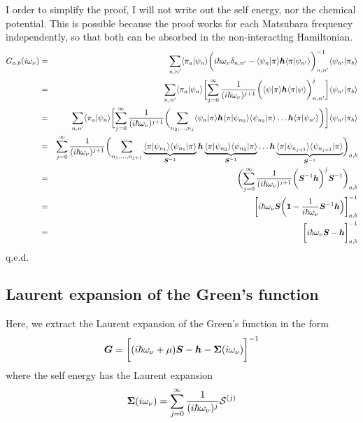 \documentclass[11pt,a4paper]{report}
\begin{document}
I order to simplify the proof, I will not write out the self energy,
nor the chemical potential. This is possible because the proof works
for each Matsubara frequency independently, so that both can be
absorbed in the non-interacting Hamiltonian.
\begin{eqnarray}
G_{a,b}(i\omega_\nu)
&=&
\sum_{n,n'}\langle\pi_a|\psi_{n}\rangle
\biggl(i\hbar\omega_\nu\delta_{n,n'}
-
\langle\psi_n|\pi\rangle
\bm{h}
\langle\pi|\psi_{n'}\rangle\biggr)^{-1}_{n,n'}
\langle\psi_{n'}|\pi_b\rangle
\nonumber\\
&=&
\sum_{n,n'}\langle\pi_a|\psi_{n}\rangle
\biggl[
\sum_{j=0}^\infty
\frac{1}{(i\hbar\omega_\nu)^{j+1}}
\biggl(
\langle\psi|\pi\rangle
\bm{h}
\langle\pi|\psi\rangle\biggr)^j_{n,n'}
\biggr]\langle\psi_{n'}|\pi_b\rangle
\nonumber\\
&=&
\sum_{n,n'}\langle\pi_a|\psi_{n}\rangle
\biggl[
\sum_{j=0}^\infty
\frac{1}{(i\hbar\omega_\nu)^{j+1}}
\biggl(\sum_{n_2,\ldots,n_{j}} 
\langle\psi_{n}|\pi\rangle
\bm{h}
\langle\pi|\psi_{n_2}\rangle\langle\psi_{n_2}|\pi\rangle
\ldots
\bm{h}
\langle\pi|\psi_{n'}\rangle\biggr)\biggr]
\langle\psi_{n'}|\pi_b\rangle
\nonumber\\
&=&
\sum_{j=0}^\infty\frac{1}{(i\hbar\omega_\nu)^{j+1}}
\biggl(\sum_{n_1,\ldots,n_{j+1}} 
\underbrace{\langle\pi|\psi_{n_1}\rangle
\langle\psi_{n_1}|\pi\rangle}_{\bm{S}^{-1}}
\bm{h}
\underbrace{\langle\pi|\psi_{n_2}\rangle\langle\psi_{n_2}|\pi\rangle}_{\bm{S}^{-1}}
\ldots
\bm{h}
\underbrace{\langle\pi|\psi_{n_{j+1}}\rangle
\langle\psi_{n_{j+1}}|\pi\rangle}_{\bm{S}^{-1}}
\biggr)_{a,b}
\nonumber\\
&=&
\biggl(\sum_{j=0}^\infty\frac{1}{(i\hbar\omega_\nu)^{j+1}}
\biggl(\bm{S}^{-1}\bm{h}\biggr)^{j}\bm{S}^{-1}\biggr)_{a,b}
\nonumber\\
&=&\biggl[i\hbar\omega_\nu\bm{S}\biggl
(\bm{1}-\frac{1}{i\hbar\omega_\nu}\bm{S}^{-1}\bm{h}\Bigr)\biggr]^{-1}_{a,b}
\nonumber\\
&=&\biggl[i\hbar\omega_\nu\bm{S}-\bm{h}\biggr]^{-1}_{a,b}
\end{eqnarray}
q.e.d.

\subsection{Laurent expansion of the Green's function}
Here, we extract the Laurent expansion of the Green's function in the form
\begin{eqnarray}
\bm{G}=\biggl[(i\hbar\omega_\nu+\mu)\bm{S}
-\bm{h}-\bm{\Sigma}(i\omega_\nu)\biggr]^{-1}
\end{eqnarray}
where the self energy has the Laurent expansion
\begin{eqnarray}
\bm{\Sigma}(i\omega_\nu)
=\sum_{j=0}^\infty\frac{1}{(i\hbar\omega_\nu)^j}\mathcal{S}^{(j)}
\end{eqnarray}
\end{document}
